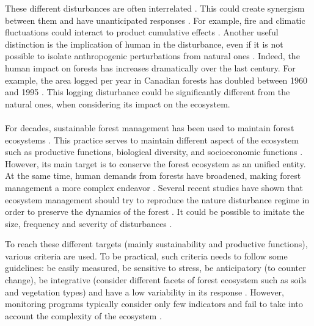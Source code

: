 \documentclass{article}
\begin{document}
These different disturbances are often interrelated \citep{keane2015exploring}. This could create synergism between them \citep{mandre_environmental_2011} and have unanticipated responses \citep{perera_simulation_2015}. For example, fire and climatic fluctuations could interact to product cumulative effects \citep{romme_historical_2009}.
Another useful distinction is the implication of human in the disturbance, even if it is not possible to isolate anthropogenic perturbations from natural ones \citep{perera_simulation_2015}.
Indeed, the human impact on forests has increases dramatically over the last century. For example, the area logged per year in Canadian forests has doubled between 1960 and 1995 \citep{smith_canadas_2000}. This logging disturbance could be significantly different from the natural ones, when considering its impact on the ecosystem.

\paragraph{}
For decades, sustainable forest management has been used to maintain forest ecosystems \citep{macdicken_global_2015}. This practice serves to maintain different aspect of the ecosystem such as productive functions, biological diversity, and socioeconomic functions \citep{makela_using_2012}. 
However, its main target is to conserve the forest ecosystem as an unified entity. %
At the same time, human demands from forests have broadened, making forest management a more complex endeavor \citep{eggers_balancing_2017}. Several recent studies have shown that ecosystem management should try to reproduce the nature disturbance regime in order to preserve the dynamics of the forest \citep{bengston_changing_1994, bengtsson_biodiversity_2000}. It could be possible to imitate the size, frequency and severity of disturbances \citep{hunter1988paleoecology, hunter1990wildlife}.

To reach these different targets (mainly sustainability and productive functions), various criteria are used. To be practical, such criteria needs to follow some guidelines: be easily measured, be sensitive to stress, be anticipatory (to counter change), be integrative (consider different facets of forest ecosystem such as soils and vegetation types) and have a low variability in its response \citep{dale_challenges_2001}. However, monitoring programs typically consider only few indicators and fail to take into account the complexity of the ecosystem \citep{dale_challenges_2001}.
\end{document}
